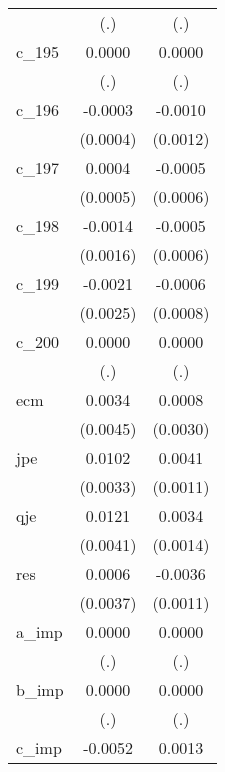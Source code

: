 {\begin{tabular}{l*{2}{c}}
            &         (.)        &         (.)        \\
[1em]
c\_195       &      0.0000        &      0.0000        \\
            &         (.)        &         (.)        \\
[1em]
c\_196       &     -0.0003        &     -0.0010        \\
            &    (0.0004)        &    (0.0012)        \\
[1em]
c\_197       &      0.0004        &     -0.0005        \\
            &    (0.0005)        &    (0.0006)        \\
[1em]
c\_198       &     -0.0014        &     -0.0005        \\
            &    (0.0016)        &    (0.0006)        \\
[1em]
c\_199       &     -0.0021        &     -0.0006        \\
            &    (0.0025)        &    (0.0008)        \\
[1em]
c\_200       &      0.0000        &      0.0000        \\
            &         (.)        &         (.)        \\
[1em]
ecm         &      0.0034        &      0.0008        \\
            &    (0.0045)        &    (0.0030)        \\
[1em]
jpe         &      0.0102\sym{**}&      0.0041\sym{**}\\
            &    (0.0033)        &    (0.0011)        \\
[1em]
qje         &      0.0121\sym{**}&      0.0034\sym{**}\\
            &    (0.0041)        &    (0.0014)        \\
[1em]
res         &      0.0006        &     -0.0036\sym{**}\\
            &    (0.0037)        &    (0.0011)        \\
[1em]
a\_imp       &      0.0000        &      0.0000        \\
            &         (.)        &         (.)        \\
[1em]
b\_imp       &      0.0000        &      0.0000        \\
            &         (.)        &         (.)        \\
[1em]
c\_imp       &     -0.0052        &      0.0013        \\

\end{tabular}}
